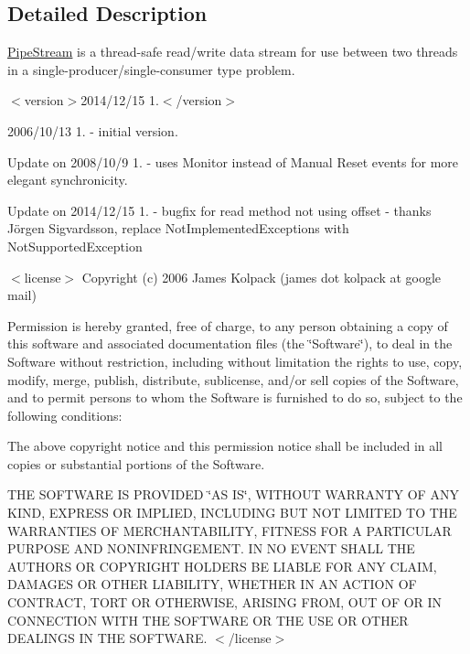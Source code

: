 \subsection{Detailed Description}
\mbox{\hyperlink{class_a_d_l_1_1_pipe_stream}{Pipe\+Stream}} is a thread-\/safe read/write data stream for use between two threads in a single-\/producer/single-\/consumer type problem. 

$<$version$>$2014/12/15 1.$<$/version$>$ 

2006/10/13 1. -\/ initial version.

Update on 2008/10/9 1. -\/ uses Monitor instead of Manual Reset events for more elegant synchronicity.

Update on 2014/12/15 1. -\/ bugfix for read method not using offset -\/ thanks Jörgen Sigvardsson, replace Not\+Implemented\+Exceptions with Not\+Supported\+Exception

$<$license$>$ Copyright (c) 2006 James Kolpack (james dot kolpack at google mail)

Permission is hereby granted, free of charge, to any person obtaining a copy of this software and associated documentation files (the \char`\"{}\+Software\char`\"{}), to deal in the Software without restriction, including without limitation the rights to use, copy, modify, merge, publish, distribute, sublicense, and/or sell copies of the Software, and to permit persons to whom the Software is furnished to do so, subject to the following conditions\+:

The above copyright notice and this permission notice shall be included in all copies or substantial portions of the Software.

T\+HE S\+O\+F\+T\+W\+A\+RE IS P\+R\+O\+V\+I\+D\+ED \char`\"{}\+A\+S I\+S\char`\"{}, W\+I\+T\+H\+O\+UT W\+A\+R\+R\+A\+N\+TY OF A\+NY K\+I\+ND, E\+X\+P\+R\+E\+SS OR I\+M\+P\+L\+I\+ED, I\+N\+C\+L\+U\+D\+I\+NG B\+UT N\+OT L\+I\+M\+I\+T\+ED TO T\+HE W\+A\+R\+R\+A\+N\+T\+I\+ES OF M\+E\+R\+C\+H\+A\+N\+T\+A\+B\+I\+L\+I\+TY, F\+I\+T\+N\+E\+SS F\+OR A P\+A\+R\+T\+I\+C\+U\+L\+AR P\+U\+R\+P\+O\+SE A\+ND N\+O\+N\+I\+N\+F\+R\+I\+N\+G\+E\+M\+E\+NT. IN NO E\+V\+E\+NT S\+H\+A\+LL T\+HE A\+U\+T\+H\+O\+RS OR C\+O\+P\+Y\+R\+I\+G\+HT H\+O\+L\+D\+E\+RS BE L\+I\+A\+B\+LE F\+OR A\+NY C\+L\+A\+IM, D\+A\+M\+A\+G\+ES OR O\+T\+H\+ER L\+I\+A\+B\+I\+L\+I\+TY, W\+H\+E\+T\+H\+ER IN AN A\+C\+T\+I\+ON OF C\+O\+N\+T\+R\+A\+CT, T\+O\+RT OR O\+T\+H\+E\+R\+W\+I\+SE, A\+R\+I\+S\+I\+NG F\+R\+OM, O\+UT OF OR IN C\+O\+N\+N\+E\+C\+T\+I\+ON W\+I\+TH T\+HE S\+O\+F\+T\+W\+A\+RE OR T\+HE U\+SE OR O\+T\+H\+ER D\+E\+A\+L\+I\+N\+GS IN T\+HE S\+O\+F\+T\+W\+A\+RE. $<$/license$>$ 

